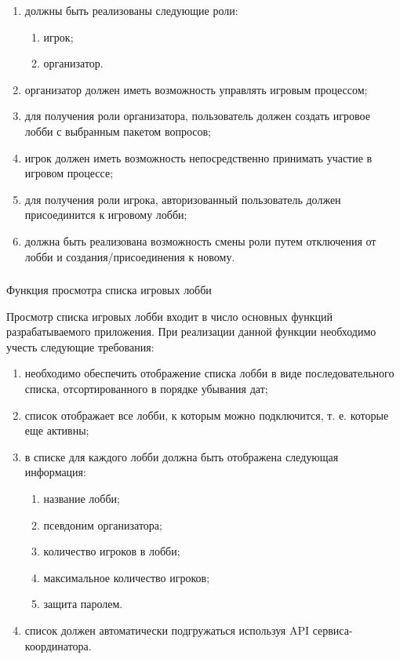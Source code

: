 \begin{enumerate}
	\item должны быть реализованы следующие роли:
	\begin{enumerate}
		\item игрок;
		\item организатор.
	\end{enumerate}
	\item организатор должен иметь возможность управлять игровым процессом;
	\item для получения роли организатора, пользователь должен создать игровое лобби с выбранным пакетом вопросов;
	\item игрок должен иметь возможность непосредственно принимать \linebreak участие в игровом процессе;
	\item для получения роли игрока, авторизованный пользователь должен присоединится к игровому лобби;
	\item должна быть реализована возможность смены роли путем отключения от лобби и создания/присоединения к новому.
\end{enumerate}

\subsubsection{} Функция просмотра списка игровых лобби
\label{sec:domain:specification:view_lobbies}

Просмотр списка игровых лобби входит в число основных функций разрабатываемого приложения. При реализации данной функции необходимо учесть следующие требования:

\begin{enumerate}
	\item необходимо обеспечить отображение списка лобби в виде последовательного списка, отсортированного в порядке убывания дат;
	\item список отображает все лобби, к которым можно подключится, т. е. которые еще активны;
	\item в списке для каждого лобби должна быть отображена следующая информация:
	\begin{enumerate}
		\item название лобби;
		\item псевдоним организатора;
		\item количество игроков в лобби;
		\item максимальное количество игроков;
		\item защита паролем.
	\end{enumerate}
	\item список должен автоматически подгружаться используя API сервиса-координатора. 
\end{enumerate}

